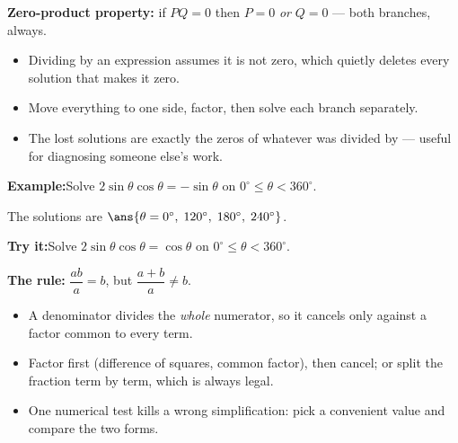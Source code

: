\documentclass[12pt]{article}
\begin{document}


\begin{formulabox}
\textbf{Zero-product property:} if $PQ = 0$ then $P = 0$ \emph{or} $Q = 0$ ---
both branches, always.
\begin{itemize}[leftmargin=0.8cm, itemsep=1pt, topsep=2pt]
  \item Dividing by an expression assumes it is not zero, which quietly deletes
        every solution that makes it zero.
  \item Move everything to one side, factor, then solve each branch separately.
  \item The lost solutions are exactly the zeros of whatever was divided by ---
        useful for diagnosing someone else's work.
\end{itemize}
\end{formulabox}

\begin{examplebox}
\textbf{Example:}\quad Solve $2\sin\theta\cos\theta = -\sin\theta$ on
$0^\circ \le \theta < 360^\circ$.

The solutions are $\ans{\theta = 0^\circ,\; 120^\circ,\; 180^\circ,\; 240^\circ}$.
\end{examplebox}

\begin{tryitbox}
\textbf{Try it:}\quad Solve $2\sin\theta\cos\theta = \cos\theta$ on
$0^\circ \le \theta < 360^\circ$.\\[2pt]
\end{tryitbox}


\begin{formulabox}
\textbf{The rule:} $\dfrac{ab}{a} = b$, but $\dfrac{a + b}{a} \neq b$.
\begin{itemize}[leftmargin=0.8cm, itemsep=1pt, topsep=2pt]
  \item A denominator divides the \emph{whole} numerator, so it cancels only
        against a factor common to every term.
  \item Factor first (difference of squares, common factor), then cancel; or
        split the fraction term by term, which is always legal.
  \item One numerical test kills a wrong simplification: pick a convenient value
        and compare the two forms.
\end{itemize}
\end{formulabox}
\end{document}
